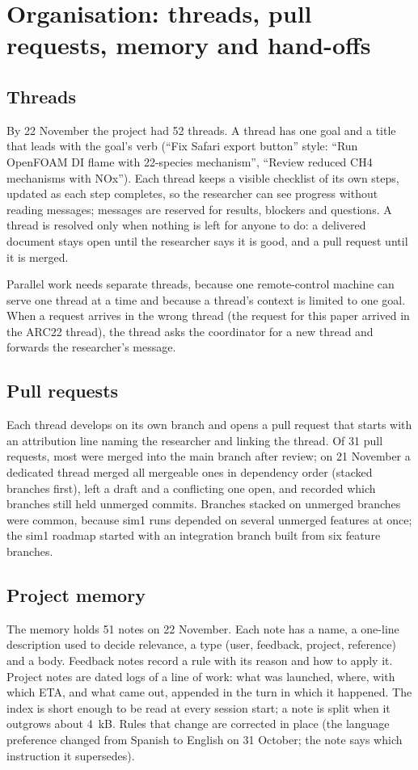 \documentclass[preprint,review,12pt]{elsarticle}
\begin{document}
\section{Organisation: threads, pull requests, memory and hand-offs}\label{sec:org}

\subsection{Threads}
By 22 November the project had 52 threads. A thread has one goal and a title that leads with the goal's verb (``Fix
Safari export button'' style: ``Run OpenFOAM DI flame with 22-species mechanism'', ``Review reduced CH4 mechanisms with
NOx''). Each thread keeps a visible checklist of its own steps, updated as each step completes, so the researcher can
see progress without reading messages; messages are reserved for results, blockers and questions. A thread is resolved
only when nothing is left for anyone to do: a delivered document stays open until the researcher says it is good, and a
pull request until it is merged.

Parallel work needs separate threads, because one remote-control machine can serve one thread at a time and because a
thread's context is limited to one goal. When a request arrives in the wrong thread (the request for this paper arrived
in the ARC22 thread), the thread asks the coordinator for a new thread and forwards the researcher's message.

\subsection{Pull requests}
Each thread develops on its own branch and opens a pull request that starts with an attribution line naming the
researcher and linking the thread. Of 31 pull requests, most were merged into the main branch after review; on 21 November
a dedicated thread merged all mergeable ones in dependency order (stacked branches first), left a draft and a
conflicting one open, and recorded which branches still held unmerged commits. Branches stacked on unmerged branches
were common, because sim1 runs depended on several unmerged features at once; the sim1 roadmap started with an
integration branch built from six feature branches.

\subsection{Project memory}
The memory holds 51 notes on 22 November. Each note has a name, a one-line description used to decide relevance, a type
(user, feedback, project, reference) and a body. Feedback notes record a rule with its reason and how to apply it.
Project notes are dated logs of a line of work: what was launched, where, with which ETA, and what came out, appended in
the turn in which it happened. The index is short enough to be read at every session start; a note is split when it
outgrows about 4~kB. Rules that change are corrected in place (the language preference changed from Spanish to English
on 31 October; the note says which instruction it supersedes).
\end{document}

